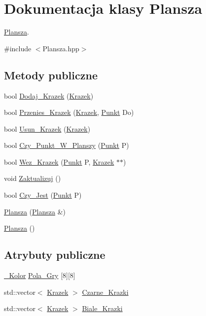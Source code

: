 \hypertarget{class_plansza}{\section{Dokumentacja klasy Plansza}
\label{class_plansza}
}


\hyperlink{class_plansza}{Plansza}.  




{\ttfamily \#include $<$Plansza.\-hpp$>$}

\subsection*{Metody publiczne}
\begin{DoxyCompactItemize}
\item 
bool \hyperlink{class_plansza_ae281651331a7fc92eb6b3431d9157ea5}{Dodaj\-\_\-\-Krazek} (\hyperlink{class_krazek}{Krazek})
\item 
bool \hyperlink{class_plansza_a5d9d50c887bab9da071effac4c53312d}{Przenies\-\_\-\-Krazek} (\hyperlink{class_krazek}{Krazek}, \hyperlink{class_punkt}{Punkt} Do)
\item 
bool \hyperlink{class_plansza_ac4123ef599193f61a85ff0c4e14baa9c}{Usun\-\_\-\-Krazek} (\hyperlink{class_krazek}{Krazek})
\item 
bool \hyperlink{class_plansza_a50c69df0d8b4e881f44c40277a8f0861}{Czy\-\_\-\-Punkt\-\_\-\-W\-\_\-\-Planszy} (\hyperlink{class_punkt}{Punkt} P)
\item 
bool \hyperlink{class_plansza_ae5b3081386cbe7b0e42f04a80a4ccc83}{Wez\-\_\-\-Krazek} (\hyperlink{class_punkt}{Punkt} P, \hyperlink{class_krazek}{Krazek} $\ast$$\ast$)
\item 
void \hyperlink{class_plansza_acd48a8540ff04b6e635c2d98829f861f}{Zaktualizuj} ()
\item 
bool \hyperlink{class_plansza_af4fa2f62f97a74c83887ea1fc5b0da54}{Czy\-\_\-\-Jest} (\hyperlink{class_punkt}{Punkt} P)
\item 
\hyperlink{class_plansza_a273aa89b08a38177c1670f2a56125f19}{Plansza} (\hyperlink{class_plansza}{Plansza} \&)
\item 
\hyperlink{class_plansza_ae58ab9e9e0a12c39f36750a0faa2c100}{Plansza} ()
\end{DoxyCompactItemize}
\subsection*{Atrybuty publiczne}
\begin{DoxyCompactItemize}
\item 
\hyperlink{_punkt_8hpp_af66113a5c012c322e61ec5429f53c13c}{\-\_\-\-Kolor} \hyperlink{class_plansza_af3bfb2efbb517325909ed2b4da05cb19}{Pola\-\_\-\-Gry} \mbox{[}8\mbox{]}\mbox{[}8\mbox{]}
\item 
std\-::vector$<$ \hyperlink{class_krazek}{Krazek} $>$ \hyperlink{class_plansza_a8ac386cacff9484384c29eae2ea3b965}{Czarne\-\_\-\-Krazki}
\item 
std\-::vector$<$ \hyperlink{class_krazek}{Krazek} $>$ \hyperlink{class_plansza_a74a767eded54ce5fd06215b9e195ff0b}{Biale\-\_\-\-Krazki}
\end{DoxyCompactItemize}


